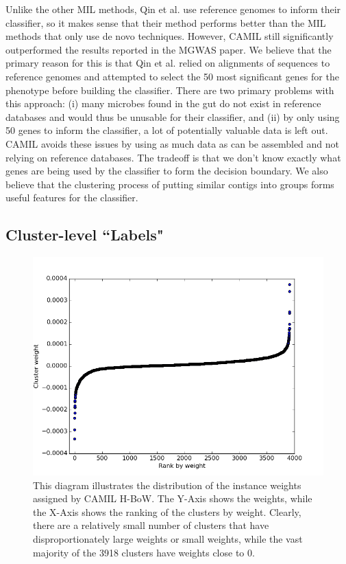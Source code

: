 Unlike the other MIL methods, Qin et al. use reference genomes to inform their classifier, so it makes sense that their method performs better than the MIL methods that only use de novo techniques. However, CAMIL still significantly outperformed the results reported in the MGWAS paper. We believe that the primary reason for this is that Qin et al. relied on alignments of sequences to reference genomes and attempted to select the 50 most significant genes for the phenotype before building the classifier. There are two primary problems with this approach: (i) many microbes found in the gut do not exist in reference databases and would thus be unusable for their classifier, and (ii) by only using 50 genes to inform the classifier, a lot of potentially valuable data is left out. CAMIL avoids these issues by using as much data as can be assembled and not relying on reference databases. The tradeoff is that we don't know exactly what genes are being used by the classifier to form the decision boundary. We also believe that the clustering process of putting similar contigs into groups forms useful features for the classifier.

\subsection{Cluster-level ``Labels"}

\begin{figure}[h]
\centering
\includegraphics[scale=0.4]{./instance-scatter.png}
\caption{This diagram illustrates the distribution of the instance weights assigned by CAMIL H-BoW. The Y-Axis shows the weights, while the X-Axis shows the ranking of the clusters by weight. Clearly, there are a relatively small number of clusters that have disproportionately large weights or small weights, while the vast majority of the 3918 clusters have weights close to 0.} \label{instance-scatter}
\end{figure}

